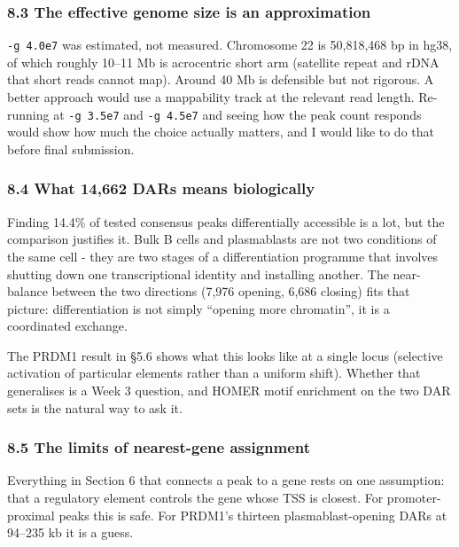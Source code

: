 \documentclass[
  11pt,
  a4paper,
]{article}
\begin{document}
\hypertarget{the-effective-genome-size-is-an-approximation}{%
\subsubsection{8.3 The effective genome size is an
approximation}\label{the-effective-genome-size-is-an-approximation}}

\texttt{-g\ 4.0e7} was estimated, not measured. Chromosome 22 is
50,818,468 bp in hg38, of which roughly 10--11 Mb is acrocentric short
arm (satellite repeat and rDNA that short reads cannot map). Around 40
Mb is defensible but not rigorous. A better approach would use a
mappability track at the relevant read length. Re-running at
\texttt{-g\ 3.5e7} and \texttt{-g\ 4.5e7} and seeing how the peak count
responds would show how much the choice actually matters, and I would
like to do that before final submission.

\hypertarget{what-14662-dars-means-biologically}{%
\subsubsection{8.4 What 14,662 DARs means
biologically}\label{what-14662-dars-means-biologically}}

Finding 14.4\% of tested consensus peaks differentially accessible is a
lot, but the comparison justifies it. Bulk B cells and plasmablasts are
not two conditions of the same cell - they are two stages of a
differentiation programme that involves shutting down one
transcriptional identity and installing another. The near-balance
between the two directions (7,976 opening, 6,686 closing) fits that
picture: differentiation is not simply ``opening more chromatin'', it is
a coordinated exchange.

The PRDM1 result in §5.6 shows what this looks like at a single locus
(selective activation of particular elements rather than a uniform
shift). Whether that generalises is a Week 3 question, and HOMER motif
enrichment on the two DAR sets is the natural way to ask it.

\hypertarget{the-limits-of-nearest-gene-assignment}{%
\subsubsection{8.5 The limits of nearest-gene
assignment}\label{the-limits-of-nearest-gene-assignment}}

Everything in Section 6 that connects a peak to a gene rests on one
assumption: that a regulatory element controls the gene whose TSS is
closest. For promoter-proximal peaks this is safe. For PRDM1's thirteen
plasmablast-opening DARs at 94--235 kb it is a guess.
\end{document}
